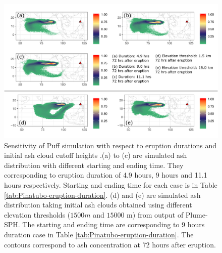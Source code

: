 \documentclass[utf8]{frontiersSCNS} %
\begin{document}
\begin{figure}[!htb]
\centering
\includegraphics[width=0.99 \textwidth]{Figures/duration_cutoff}
\caption{Sensitivity of Puff simulation with respect to eruption durations and initial ash cloud cutoff heights .(a) to (c) are simulated ash distribution with different starting and ending time. They corresponding to eruption duration of 4.9 hours, 9 hours and 11.1 hours respectively. Starting and ending time for each case is in Table \ref{tab:Pinatubo-eruption-duration}. (d) and (e) are simulated ash distribution taking initial ash clouds obtained using different elevation thresholds ($1500 m$ and $15000$ m) from output of Plume-SPH. The starting and ending time are corresponding to 9 hours duration case in Table \ref{tab:Pinatubo-eruption-duration}. The contours correspond to ash concentration at 72 hours after eruption.}
\label{fig:Puff-sensitivity-duration-cutoff} 
\end{figure}
\end{document}
